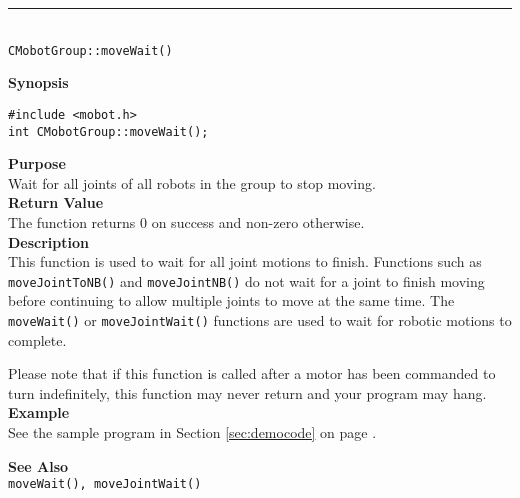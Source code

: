 \noindent
\vspace{5pt}
\rule{4.5in}{0.015in}\\
\noindent
{\LARGE \texttt{CMobotGroup::moveWait()}}\\
{}

\noindent
{\bf Synopsis}
\vspace{-8pt}
\begin{verbatim}
#include <mobot.h>
int CMobotGroup::moveWait();
\end{verbatim}

\noindent
{\bf Purpose}\\
Wait for all joints of all robots in the group to stop moving.\\

\noindent
{\bf Return Value}\\
The function returns 0 on success and non-zero otherwise.\\

\noindent
{\bf Description}\\
This function is used to wait for all joint motions to finish. Functions such as
\texttt{moveJointToNB()} and \texttt{moveJointNB()} do not wait for a joint to finish
moving before continuing to allow multiple joints to move at the same time. The
\texttt{moveWait()} or \texttt{moveJointWait()} functions are used to wait for
robotic motions to complete.

Please note that if this function is called after a motor has been commanded to
turn indefinitely, this function may never return and your program may hang.\\

\noindent
{\bf Example}\\
See the sample program in Section \ref{sec:democode} on page \pageref{sec:democode}.
\noindent

\noindent
{\bf See Also}\\
\texttt{moveWait(), moveJointWait()}


